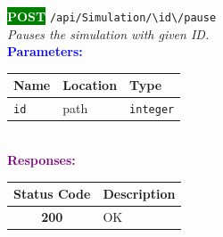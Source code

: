 \begin{tcolorbox}[
    colback=green!5,
    colframe=green,
    arc=2mm,
    boxrule=1pt,
    left=5pt,
    right=5pt,
    top=5pt,
    bottom=5pt
]
\noindent\colorbox{green}{\textcolor{white}{\textbf{POST}}} 
\texttt{\large /api/Simulation/\textbackslash{}{id\textbackslash{}}/pause}\\[0.3em]
\textit{Pauses the simulation with given ID.}\\[0.3em]
\vspace{0.3em}
\textbf{\textcolor{blue}{Parameters:}}\\[0.2em]
\begin{tabular}{|l|l|l|}
\hline
\rowcolor{gray!20}
\textbf{Name} & \textbf{Location} & \textbf{Type} \\ \hline
\texttt{id} & path & \texttt{integer} \\ \hline
\end{tabular}\\[0.5em]
\vspace{0.3em}
\textbf{\textcolor{purple}{Responses:}}\\[0.2em]
\begin{tabular}{|c|p{10cm}|}
\hline
\rowcolor{gray!20}
\textbf{Status Code} & \textbf{Description} \\ \hline
\colorbox{green!20}{\textbf{200}} & OK \\ \hline
\end{tabular}
\end{tcolorbox}
\vspace{0.5em}

